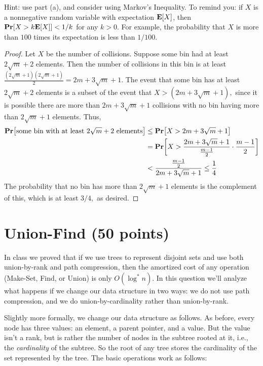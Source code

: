 \documentclass{article}
\newcommand{\prob}[1]{\ensuremath{\text{{\bf Pr}$\left[#1\right]$}}}
\newcommand{\expct}[1]{\ensuremath{\text{{\bf E}$\left[#1\right]$}}}
\begin{document}
\begin{enumerate}[(a)]
		Hint: use part (a), and consider using Markov's Inequality.  To remind you: if $X$ is a nonnegative random variable with expectation $\expct{X}$, then $\prob{X > k \expct{X}} < 1/k$ for any $k > 0$.  For example, the probability that $X$ is more than $100$ times its expectation is less than $1/100$.  
		\begin{proof}
			Let $X$ be the number of collisions. Suppose some bin had at least $2\sqrt{m}+2$ elements. Then the number of collisions in this bin is at least $\frac{(2\sqrt{m}+1)(2\sqrt{m}+1)}{2} = 2m+3\sqrt{m}+1.$ The event that some bin has at least $2\sqrt{m}+2$ elements is a subset of the event that $X>(2m+3\sqrt{m}+1),$ since it is possible there are more than $2m+3\sqrt{m}+1$ collisions with no bin having more than $2\sqrt{m}+1$ elements. Thus,
			\begin{align*}
				\prob{\text{some bin with at least }2\sqrt{m}+2\text{ elements}} &\le \prob{X>2m+3\sqrt{m}+1} \\
				&= \prob{X>\frac{2m+3\sqrt{m}+1}{\frac{m-1}{2}}\cdot \frac{m-1}{2}} \\
				&< \frac{\frac{m-1}{2}}{2m+3\sqrt{m}+1} \le \frac{1}{4}
			\end{align*}
			The probability that no bin has more than $2\sqrt{m}+1$ elements is the complement of this, which is at least $3/4,$ as desired.
		\end{proof}

\end{enumerate}

\section{Union-Find (50 points)}

In class we proved that if we use trees to represent disjoint sets and use both union-by-rank and path compression, then the amortized cost of any operation (Make-Set, Find, or Union) is only $O(\log^* n)$.  In this question we'll analyze what happens if we change our data structure in two ways: we do not use path compression, and we do union-by-cardinality rather than union-by-rank.

Slightly more formally, we change our data structure as follows.  As before, every node has three values: an element, a parent pointer, and a value.  But the value isn't a rank, but is rather the number of nodes in the subtree rooted at it, i.e., the \emph{cardinality} of the subtree.  So the root of any tree stores the cardinality of the set represented by the tree. The basic operations work as follows:
\end{document}
